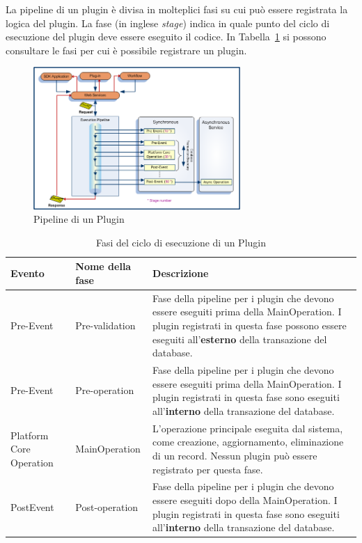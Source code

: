 La pipeline di un plugin è divisa in molteplici fasi su cui può essere registrata la logica del plugin. La fase (in inglese \textit{stage}) indica in quale punto del ciclo di esecuzione del plugin deve essere eseguito il codice. In Tabella~\ref{table:pluginStages} si possono consultare le fasi per cui è possibile registrare un plugin.  

\begin{figure}[ht]
  \centering
  \includegraphics[width=0.7\textwidth]{plugin-pipeline.png}
  \caption{Pipeline di un Plugin}
  \label{fig:pluginPipeline}
\end{figure}

\begin{table}[ht!]
  \centering
  \begin{tabular}{p{}lp{}}
    \toprule
      \textbf{Evento} & \textbf{Nome della fase} & \textbf{Descrizione} \\
    \midrule
      Pre-Event & Pre-validation &  Fase della pipeline per i plugin che devono essere eseguiti prima della MainOperation. I plugin registrati in questa fase possono essere eseguiti all'\textbf{esterno} della transazione del database. \\
    \midrule
      Pre-Event & Pre-operation & Fase della pipeline per i plugin che devono essere eseguiti prima della MainOperation. I plugin registrati in questa fase sono eseguiti all'\textbf{interno} della transazione del database. \\
    \midrule
      Platform Core Operation & MainOperation &  L'operazione principale eseguita dal sistema, come creazione, aggiornamento, eliminazione di un record. Nessun plugin può essere registrato per questa fase. \\
    \midrule
      PostEvent & Post-operation &  Fase della pipeline per i plugin che devono essere eseguiti dopo della MainOperation. I plugin registrati in questa fase sono eseguiti all'\textbf{interno} della transazione del database. \\
    \bottomrule
  \end{tabular}
  \caption{Fasi del ciclo di esecuzione di un Plugin}
  \label{table:pluginStages}
\end{table}

